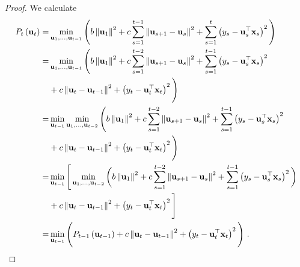 \begin{proof}
We calculate
\begin{align*}
P_{t}\left(\mathbf{u}_{t}\right)
=&  \min_{\mathbf{u}_{1},\ldots,\mathbf{u}_{t-1}} \Bigg(b\left\Vert \mathbf{u}_{1}\right\Vert ^{2}+c\sum_{s=1}^{t-1}\left\Vert \mathbf{u}_{s+1}-\mathbf{u}_{s}\right\Vert ^{2}+\sum_{s=1}^{t}\left(y_{s}-{\mathbf{u}}^{\top}_{s}\mathbf{x}_{s}\right)^{2}\Bigg)\\
 =&   \min_{\mathbf{u}_{1},\ldots,\mathbf{u}_{t-1}}
\Bigg(b\left\Vert \mathbf{u}_{1}\right\Vert
^{2}+c\sum_{s=1}^{t-2}\left\Vert
  \mathbf{u}_{s+1}-\mathbf{u}_{s}\right\Vert
^{2}+\sum_{s=1}^{t-1}\left(y_{s}-{\mathbf{u}}^{\top}_{s}\mathbf{x}_{s}\right)^{2}\\
&+c\left\Vert \mathbf{u}_{t}-\mathbf{u}_{t-1}\right\Vert ^{2}
+\left(y_{t}-{\mathbf{u}}^{\top}_{t}\mathbf{x}_{t}\right)^{2}\Bigg)\\
  =&
  \min_{\mathbf{u}_{t-1}}\min_{\mathbf{u}_{1},\ldots,\mathbf{u}_{t-2}}\Bigg(b\left\Vert
    \mathbf{u}_{1}\right\Vert ^{2}+c\sum_{s=1}^{t-2}\left\Vert
    \mathbf{u}_{s+1}-\mathbf{u}_{s}\right\Vert
  ^{2}+\sum_{s=1}^{t-1}\left(y_{s}-{\mathbf{u}}^{\top}_{s}\mathbf{x}_{s}\right)^{2}\\
&+c\left\Vert \mathbf{u}_{t}-\mathbf{u}_{t-1}\right\Vert ^{2}
+\left(y_{t}-{\mathbf{u}}^{\top}_{t}\mathbf{x}_{t}\right)^{2}\Bigg)\\
  =&
 \min_{\mathbf{u}_{t-1}}\Bigg[\min_{\mathbf{u}_{1},\ldots,\mathbf{u}_{t-2}}
 \bigg(b\left\Vert
     \mathbf{u}_{1}\right\Vert ^{2}+c\sum_{s=1}^{t-2}\left\Vert
     \mathbf{u}_{s+1}-\mathbf{u}_{s}\right\Vert
   ^{2}+\sum_{s=1}^{t-1}\left(y_{s}-{\mathbf{u}}^{\top}_{s}\mathbf{x}_{s}\right)^{2}\bigg)\\
&+c\left\Vert \mathbf{u}_{t}-\mathbf{u}_{t-1}\right\Vert ^{2}+\left(y_{t}-{\mathbf{u}}^{\top}_{t}\mathbf{x}_{t}\right)^{2}\Bigg]\\
   =&  \min_{\mathbf{u}_{t-1}}\Bigg(P_{t-1}\left(\mathbf{u}_{t-1}\right)+c\left\Vert \mathbf{u}_{t}-\mathbf{u}_{t-1}\right\Vert ^{2}+\left(y_{t}-{\mathbf{u}}^{\top}_{t}\mathbf{x}_{t}\right)^{2}\Bigg) ~.
\end{align*}

\end{proof}
